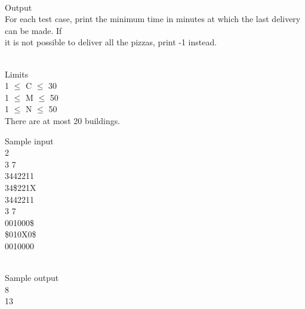 \\   Output   
\\   For each test case, print the minimum time in minutes at which the last delivery can be made. If   
\\   it is not possible to deliver all the pizzas, print -1 instead.  


\\   Limits   
\\   1  $\le$  C  $\le$  30   
\\   1  $\le$  M  $\le$  50   
\\   1  $\le$  N  $\le$  50   
\\   There are at most 20 buildings.  

   Sample input   
\\   2   
\\   3 7   
\\   3442211   
\\   34\$221X   
\\   3442211   
\\   3 7   
\\   001000\$   
\\   \$010X0\$   
\\   0010000  


\\   Sample output   
\\   8   
\\   13  
